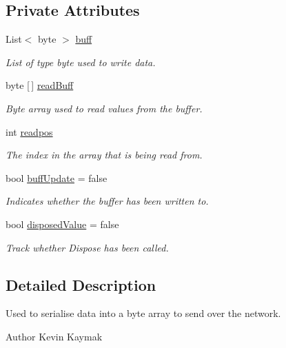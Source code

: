 \subsection*{Private Attributes}
\begin{DoxyCompactItemize}
\item 
List$<$ byte $>$ \mbox{\hyperlink{class_byte_buffer_a0315ca3f2cc48d70d23e6307c80b10df}{buff}}
\begin{DoxyCompactList}\small\item\em List of type byte used to write data. \end{DoxyCompactList}\item 
byte \mbox{[}$\,$\mbox{]} \mbox{\hyperlink{class_byte_buffer_a596083ce90920715bc128859314bfd1f}{read\+Buff}}
\begin{DoxyCompactList}\small\item\em Byte array used to read values from the buffer. \end{DoxyCompactList}\item 
int \mbox{\hyperlink{class_byte_buffer_a266fa418f19f51b4929a7d38c8edef3d}{readpos}}
\begin{DoxyCompactList}\small\item\em The index in the array that is being read from. \end{DoxyCompactList}\item 
bool \mbox{\hyperlink{class_byte_buffer_ac044a6c428d4cda3ac745180dad00ef8}{buff\+Update}} = false
\begin{DoxyCompactList}\small\item\em Indicates whether the buffer has been written to. \end{DoxyCompactList}\item 
bool \mbox{\hyperlink{class_byte_buffer_a0fb55465ef850201cd378011f4bee87f}{disposed\+Value}} = false
\begin{DoxyCompactList}\small\item\em Track whether Dispose has been called. \end{DoxyCompactList}\end{DoxyCompactItemize}


\subsection{Detailed Description}
Used to serialise data into a byte array to send over the network. 

\begin{DoxyAuthor}{Author}
Kevin Kaymak
\end{DoxyAuthor}


